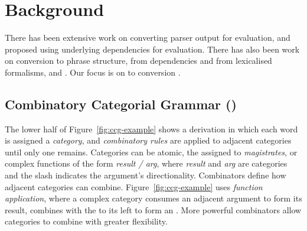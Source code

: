 \section{Background}

There has been extensive work on converting parser output for evaluation, \myeg
\textcite{Lin:1998} and \textcite{Briscoe-Carroll-Graham-Copestake:2002} proposed
using underlying dependencies for evaluation.  There has also been work on
conversion to phrase structure, from dependencies \parencite{Xia:2001,Xia:2009} and
from lexicalised formalisms, \myeg \hpsg \parencite{Matsuzaki-Tsujii:2008} and \mytag
\parencite{Chiang:2000,Sarkar:2001}. Our focus is on \ccg to \ptb conversion
\parencite{Clark-Curran:2009}.

\subsection{Combinatory Categorial Grammar (\ccg)}

The lower half of Figure~\ref{fig:ccg-example} shows a \ccg derivation
\parencite{Steedman:2000} in which each word is assigned a {\em category}, and
{\em combinatory rules} are applied to adjacent categories until only one
remains.  Categories can be atomic, \myeg the  assigned to
\textit{magistrates}, or complex functions of the form {\em result / arg}, where
{\em result} and {\em arg} are categories and the slash indicates the argument's
directionality.  Combinators define how adjacent categories can combine.
Figure~\ref{fig:ccg-example} uses {\em function application}, where a complex
category consumes an adjacent argument to form its result, \myeg {} combines with the  to its left to form an .  More
powerful combinators allow categories to combine with greater flexibility.

